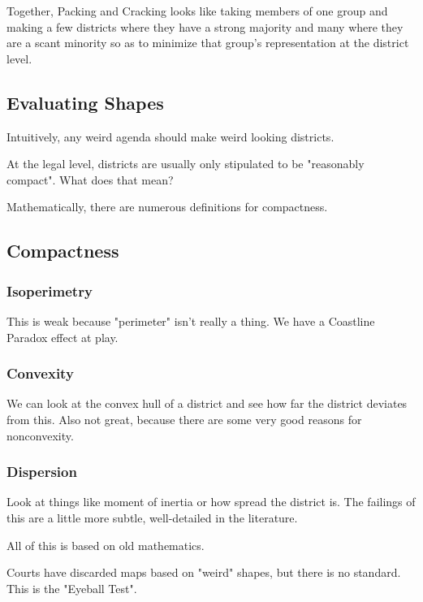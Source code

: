 Together, Packing and Cracking looks like taking members of one group and making a few districts where they have a strong majority and many where they are a scant minority so as to minimize that group's representation at the district level.

\subsection*{Evaluating Shapes}

Intuitively, any weird agenda should make weird looking districts.

At the legal level, districts are usually only stipulated to be "reasonably compact".  What does that mean?

Mathematically, there are numerous definitions for compactness.
\subsection*{Compactness}

\subsubsection*{Isoperimetry}

  This is weak because "perimeter" isn't really a thing.  We have a Coastline Paradox effect at play.

\subsubsection*{Convexity}

We can look at the convex hull of a district and see how far the district deviates from this.  Also not great, because there are some very good reasons for nonconvexity.

\subsubsection*{Dispersion}

Look at things like moment of inertia or how spread the district is.  The failings of this are a little more subtle, well-detailed in the literature.
	
	
All of this is based on old mathematics.

Courts have discarded maps based on "weird" shapes, but there is no standard.  This is the "Eyeball Test".

